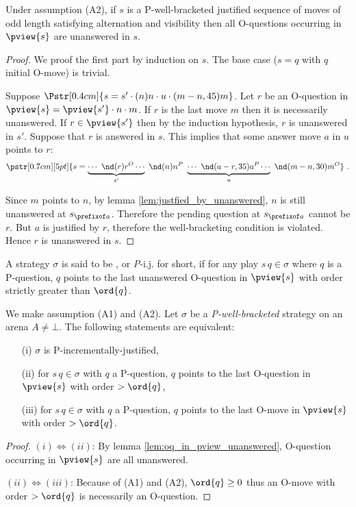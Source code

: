 \begin{lemma}
\label{lem:oq_in_pview_unanswered}
Under assumption (A2), if $s$ is a P-well-bracketed justified sequence of moves of odd length satisfying alternation and visibility then  all O-questions occurring in $\pview{s}$ are unanswered in $s$.
\end{lemma}
\begin{proof}
We proof the first part by induction on $s$.
The base case ($s = q$ with $q$ initial O-move) is trivial.

Suppose $\Pstr[0.4cm]{ s = s' \cdot (n)n \cdot u \cdot (m-n,45){m} }$.
Let $r$ be an O-question in $\pview{s} = \pview{s'} \cdot n \cdot m$.
If $r$ is the last move $m$ then it is necessarily unanswered.
If $r \in \pview{s'}$ then by the induction hypothesis, $r$ is unanswered in $s'$.
Suppose that $r$ is answered in $s$. This implies that some answer move $a$ in $u$ points to $r$:
$$\pstr[0.7cm][5pt]{ s = \underbrace{\cdots\ \nd(r){r}^O \cdots }_{s'} \
\nd(n){n}^P \ \underbrace{\cdots\ \nd(a-r,35){a}^P \cdots }_{u} \
\nd(m-n,30){m}^O } \ .$$
 
Since $m$ points to $n$, by lemma \ref{lem:justfied_by_unanswered}, $n$ is still unanswered at $s_{\prefixof a}$. Therefore the pending
question at $s_{\prefixof a}$ cannot be $r$. But $a$ is justified by $r$, therefore the well-bracketing condition is violated. Hence $r$ is
unanswered in $s$.
\end{proof}





\begin{definition}\rm
  A strategy $\sigma$ is said to be \defname{P-incrementally
    justified}, or {\emph P-i.j.} for short, if for any play $s \, q \in \sigma$ where $q$ is a
  P-question, $q$ points to the last unanswered O-question in $\pview{s}$ with
  order strictly greater than $\ord{q}$.
\end{definition}

\begin{proposition}
\label{prop:char_pincr}
\rm We make assumption (A1) and (A2).
Let $\sigma$ be a \emph{P-well-bracketed} strategy on an arena $A\neq \bot$.
The following statements are equivalent:
\begin{enumerate}
\item[(i)] $\sigma$ is P-incrementally-justified,
\item[(ii)] for $s \, q \in \sigma$ with $q$ a P-question, $q$ points to the last O-question in $\pview{s}$ with order $>\ord{q}$,
\item[(iii)] for $s \, q \in \sigma$ with $q$ a P-question, $q$ points to the last O-move in $\pview{s}$ with order $>\ord{q}$.
\end{enumerate}
\end{proposition}
\begin{proof}
$(i)\iff(ii)$: By lemma \ref{lem:oq_in_pview_unanswered}, O-question occurring in $\pview{s}$ are all unanswered.

$(ii)\iff(iii)$: Because of (A1) and (A2), $\ord{q} \geq 0$ thus an O-move with order $>\ord{q}$ is necessarily an O-question.
\end{proof}

